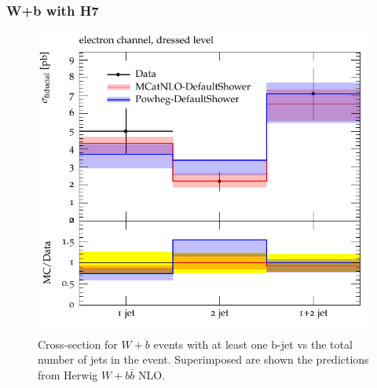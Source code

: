 \documentclass[11pt]{cernrep}
\newcommand{\Herwig}{H\protect\scalebox{0.8}{ERWIG}7\xspace}
\begin{document}
\subsubsection{W+b with \Herwig}
\label{sec:WHerwig}

\begin{figure}[htbp]
\begin{center}
   \includegraphics[scale=0.65]{figs/wbb/herwig/d01-x01-y02.pdf}
\end{center}
\caption{Cross-section for $W+b$ events with at least one b-jet vs the total
  number of jets in the event. Superimposed are shown the predictions from
  Herwig $W+b\bar{b}$ NLO.}
\label{wbb-njet-herwig}
\end{figure}
\end{document}
